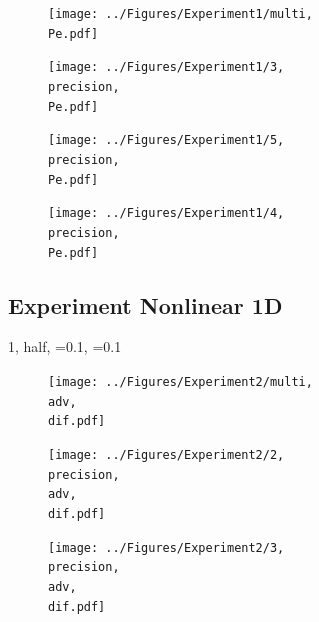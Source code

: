 \documentclass{scrartcl}
\begin{document}
	\begin{figure}[H]
		\centering
		\texttt{[image: ../Figures/Experiment1/multi, \\Pe.pdf]}
	\end{figure}
	
	\begin{figure}[H]
		\centering
		\texttt{[image: ../Figures/Experiment1/3, \\precision, \\Pe.pdf]}
	\end{figure}
	
	\begin{figure}[H]
		\centering
		\texttt{[image: ../Figures/Experiment1/5, \\precision, \\Pe.pdf]}
	\end{figure}
	
	\begin{figure}[H]
		\centering
		\texttt{[image: ../Figures/Experiment1/4, \\precision, \\Pe.pdf]}
	\end{figure}
	
	
	\newpage
	\subsection{Experiment Nonlinear 1D}
	\newcommand{\adv}{\detokenize{α}=0.1}
	\newcommand{\dif}{\detokenize{β}=0.1}
	\renewcommand{\precision}{half}
	{1, \precision, \adv, \dif}
	\begin{figure}[H]
		\centering
		\texttt{[image: ../Figures/Experiment2/multi, \\adv, \\dif.pdf]}
	\end{figure}
	
	\begin{figure}[H]
		\centering
		\texttt{[image: ../Figures/Experiment2/2, \\precision, \\adv, \\dif.pdf]}
	\end{figure}
	
	\begin{figure}[H]
		\centering
		\texttt{[image: ../Figures/Experiment2/3, \\precision, \\adv, \\dif.pdf]}
	\end{figure}
	
\end{document}
